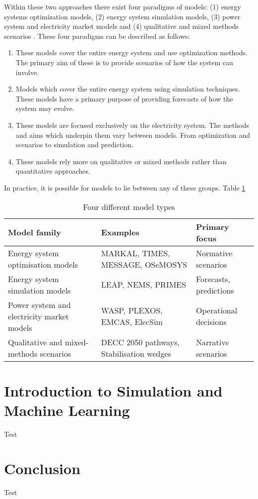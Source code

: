 Within these two approaches there exist four paradigms of models: (1) energy systems optimization models, (2) energy system simulation models, (3) power system and electricity market models and (4) qualitative and mixed methods scenarios \cite{Pfenninger2014a}. These four paradigms can be described as follows:

\begin{enumerate}
	\item These models cover the entire energy system and use optimization methods. The primary aim of these is to provide scenarios of how the system can involve.
	\item Models which cover the entire energy system using simulation techniques. These models have a primary purpose of providing forecasts of how the system may evolve.
	\item These models are focused exclusively on the electricity system. The methods and aims which underpin them vary between models. From optimization and scenarios to simulation and prediction.
	\item These models rely more on qualitative or mixed methods rather than quantitative approaches.
\end{enumerate}

In practice, it is possible for models to lie between any of these groups. Table \ref{tab:intro:modeltypes}

\begin{table}[]
	\footnotesize
	\caption{Four different model types \cite{Pfenninger2014a}}
	\label{tab:intro:modeltypes}
	\begin{tabular}{@{}lll@{}}
		\toprule
		Model family                               & Examples                                 & Primary focus                            \\ \midrule
		Energy system optimisation models          & MARKAL, TIMES, MESSAGE, OSeMOSYS         & Normative scenarios                      \\
		Energy system simulation models            & LEAP, NEMS, PRIMES                       & Forecasts, predictions                   \\
		Power system and electricity market models & WASP, PLEXOS, EMCAS, ElecSim             & Operational decisions \\
		Qualitative and mixed-methods scenarios    & DECC 2050 pathways, Stabilisation wedges & Narrative scenarios                      \\ \bottomrule
	\end{tabular}
\end{table}





\section{Introduction to Simulation and Machine Learning}
\label{sec:intro:simulationmodelling}
Test

\section{Conclusion}
\label{sec:intro:conclusion}
Test